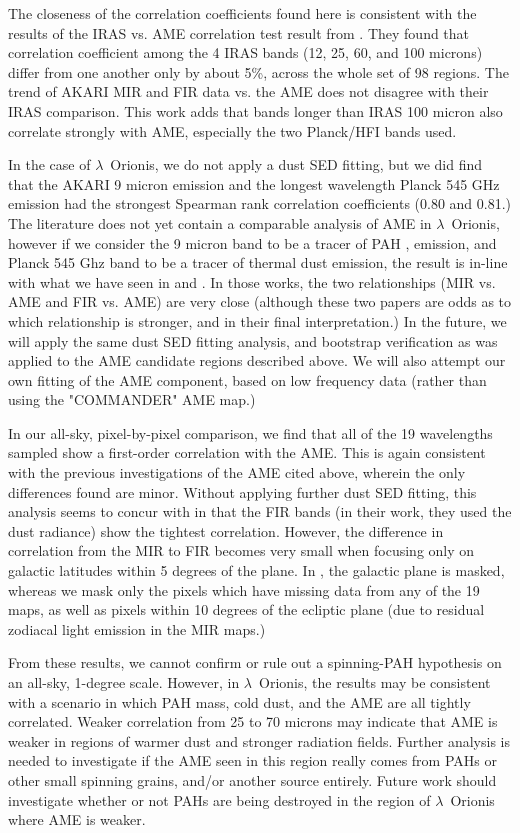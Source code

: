 \documentclass[preprint2,longabstract]{aastex}
\begin{document}
        	The closeness of the correlation coefficients found here is consistent with the results of the IRAS vs. AME correlation test result from \cite{planckXV}. They found that correlation coefficient among the 4 IRAS bands (12, 25, 60, and 100 microns) differ from one another only by about 5\%, across the whole set of 98 regions. The trend of AKARI MIR and FIR data vs. the AME does not disagree with their IRAS comparison. This work adds that bands longer than IRAS 100 micron also correlate strongly with AME, especially the two Planck/HFI bands used.


         In the case of $\lambda$~Orionis, we do not apply a dust SED fitting, but we did find that the AKARI 9 micron emission and the longest wavelength Planck 545 GHz emission had the strongest Spearman rank correlation coefficients (0.80 and 0.81.) The literature does not yet contain a comparable analysis of AME in $\lambda$~Orionis, however if we consider the 9 micron band to be a tracer of PAH , emission, and Planck 545 Ghz band to be a tracer of thermal dust emission, the result is in-line with what we have seen in \cite{ysard10b} and \cite{hensley16}. In those works, the two relationships (MIR vs. AME and FIR vs. AME) are very close (although these two papers are odds as to which relationship is stronger, and in their final interpretation.) In the future, we will apply the same dust SED fitting analysis, and bootstrap verification as was applied to the AME candidate regions described above. We will also attempt our own fitting of the AME component, based on low frequency data (rather than using the "COMMANDER" AME map.)

       In our all-sky, pixel-by-pixel comparison, we find that all of the 19 wavelengths sampled show a first-order correlation with the AME. This is again consistent with the previous investigations of the AME cited above, wherein the only differences found are minor. Without applying further dust SED fitting, this analysis seems to concur with \cite{hensley16} in that the FIR bands (in their work, they used the dust radiance) show the tightest correlation. However, the difference in correlation from the MIR to FIR becomes very small when focusing only on galactic latitudes within 5 degrees of the plane. In \cite{hensley16}, the galactic plane is masked, whereas we mask only the pixels which have missing data from any of the 19 maps, as well as pixels within 10 degrees of the ecliptic plane (due to residual zodiacal light emission in the MIR maps.)

     From these results, we cannot confirm or rule out a spinning-PAH hypothesis on an all-sky, 1-degree scale. However, in  $\lambda$~Orionis, the results may be consistent with a scenario in which PAH mass, cold dust, and the AME are all tightly correlated. Weaker correlation from 25 to 70 microns may indicate that AME is weaker in regions of warmer dust and stronger radiation fields. Further analysis is needed to investigate if the AME seen in this region really comes from PAHs or other small spinning grains, and/or another source entirely.  Future work should investigate whether or not PAHs are being destroyed in the region of $\lambda$~Orionis where AME is weaker.
\end{document}
